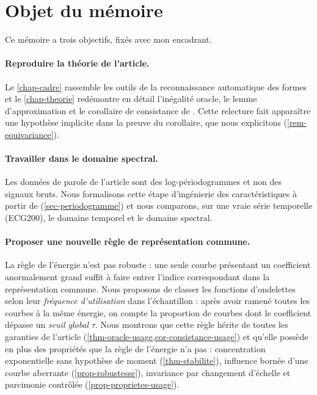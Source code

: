 \section{Objet du mémoire}

Ce mémoire a trois objectifs, fixés avec mon encadrant.

\paragraph{Reproduire la théorie de l'article.} Le \cref{chap-cadre} rassemble les outils de la reconnaissance automatique des formes \citep{devroye1988automatic,devroye1996probabilistic} et le \cref{chap-theorie} redémontre en détail l'inégalité oracle, le lemme d'approximation et le corollaire de consistance de \citet{berlinet2008functional}. Cette relecture fait apparaître une hypothèse implicite dans la preuve du corollaire, que nous explicitons (\cref{rem-equivariance}).

\paragraph{Travailler dans le domaine spectral.} Les données de parole de l'article sont des log-périodogrammes et non des signaux bruts. Nous formalisons cette étape d'ingénierie des caractéristiques à partir de \citet{shumway2011time} (\cref{sec-periodogramme}) et nous comparons, sur une vraie série temporelle (ECG200), le domaine temporel et le domaine spectral.

\paragraph{Proposer une nouvelle règle de représentation commune.} La règle de l'énergie n'est pas robuste : une seule courbe présentant un coefficient anormalement grand suffit à faire entrer l'indice correspondant dans la représentation commune. Nous proposons de classer les fonctions d'ondelettes selon leur \emph{fréquence d'utilisation} dans l'échantillon : après avoir ramené toutes les courbes à la même énergie, on compte la proportion de courbes dont le coefficient dépasse un \emph{seuil global} $\tau$. Nous montrons que cette règle hérite de toutes les garanties de l'article (\cref{thm-oracle-usage,cor-consistance-usage}) et qu'elle possède en plus des propriétés que la règle de l'énergie n'a pas : concentration exponentielle sans hypothèse de moment (\cref{thm-stabilite}), influence bornée d'une courbe aberrante (\cref{prop-robustesse}), invariance par changement d'échelle et parcimonie contrôlée (\cref{prop-proprietes-usage}).

